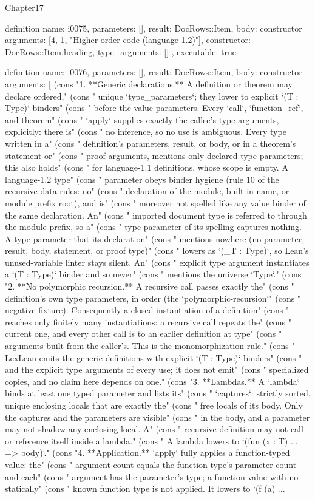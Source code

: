 \begin{lexlean}{Chapter17}
\begin{semanticmodule}
definition{
  name: i0075,
  parameters: [],
  result: DocRows::Item,
  body: constructor{
    arguments: [4, 1, "Higher-order code (language 1.2)"],
    constructor: DocRows::Item.heading,
    type_arguments: []
  },
  executable: true
}

definition{
  name: i0076,
  parameters: [],
  result: DocRows::Item,
  body: constructor{
    arguments: [
      (cons "1. **Generic declarations.** A definition or theorem may declare ordered," (cons "   unique `type_parameters`; they lower to explicit `(T : Type)` binders" (cons "   before the value parameters. Every `call`, `function_ref`, and theorem" (cons "   `apply` supplies exactly the callee's type arguments, explicitly: there is" (cons "   no inference, so no use is ambiguous. Every type written in a" (cons "   definition's parameters, result, or body, or in a theorem's statement or" (cons "   proof arguments, mentions only declared type parameters; this also holds" (cons "   for language-1.1 definitions, whose scope is empty. A language-1.2 type" (cons "   parameter obeys binder hygiene (rule 10 of the recursive-data rules: no" (cons "   declaration of the module, built-in name, or module prefix root), and is" (cons "   moreover not spelled like any value binder of the same declaration. An" (cons "   imported document type is referred to through the module prefix, so a" (cons "   type parameter of its spelling captures nothing. A type parameter that its declaration" (cons "   mentions nowhere (no parameter, result, body, statement, or proof type)" (cons "   lowers as `(_T : Type)`, so Lean's unused-variable linter stays silent. An" (cons "   explicit type argument instantiates a `(T : Type)` binder and so never" (cons "   mentions the universe `Type`." (cons "2. **No polymorphic recursion.** A recursive call passes exactly the" (cons "   definition's own type parameters, in order (the `polymorphic-recursion`" (cons "   negative fixture). Consequently a closed instantiation of a definition" (cons "   reaches only finitely many instantiations: a recursive call repeats the" (cons "   current one, and every other call is to an earlier definition at type" (cons "   arguments built from the caller's. This is the monomorphization rule." (cons "   LexLean emits the generic definitions with explicit `(T : Type)` binders" (cons "   and the explicit type arguments of every use; it does not emit" (cons "   specialized copies, and no claim here depends on one." (cons "3. **Lambdas.** A `lambda` binds at least one typed parameter and lists its" (cons "   `captures`: strictly sorted, unique enclosing locals that are exactly the" (cons "   free locals of its body. Only the captures and the parameters are visible" (cons "   in the body, and a parameter may not shadow any enclosing local. A" (cons "   recursive definition may not call or reference itself inside a lambda." (cons "   A lambda lowers to `(fun (x : T) ... => body)`." (cons "4. **Application.** `apply` fully applies a function-typed value: the" (cons "   argument count equals the function type's parameter count and each" (cons "   argument has the parameter's type; a function value with no statically" (cons "   known function type is not applied. It lowers to `(f (a) ... }}
\end{semanticmodule}
\end{lexlean}
